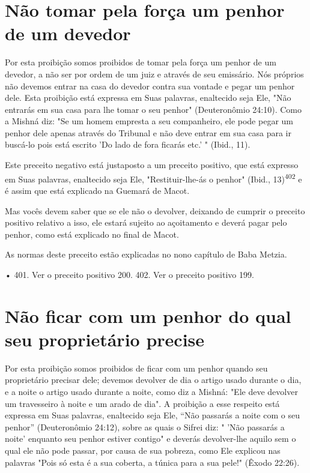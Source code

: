 \section{Não tomar pela força um penhor de um devedor}

Por esta proibição somos proibidos de tomar pela força um penhor de um
devedor, a não ser por ordem de um juiz e através de seu emissário. Nós
próprios não devemos entrar na casa do devedor contra sua vontade e
pe­gar um penhor dele. Esta proibição está expressa em Suas palavras,
enaltecido seja Ele, "Não entrarás em sua casa para lhe tomar o seu
penhor" (Deuteronô­mio 24:10). Como a Mishná diz: "Se um homem empresta
a seu companheiro, ele pode pegar um penhor dele apenas através do
Tribunal e não deve entrar em sua casa para ir buscá-lo pois está
escrito 'Do lado de fora ficarás etc.' " (Ibid., 11).

Este preceito negativo está justaposto a um preceito positivo, que está
expresso em Suas palavras, enaltecido seja Ele, "Restituir-lhe-ás o
penhor" (Ibid., 13)\textsuperscript{402} e é assim que está explicado na
Guemará de Macot.

Mas vocês devem saber que se ele não o devolver, deixando de cum­prir o
preceito positivo relativo a isso, ele estará sujeito ao açoitamento e
deve­rá pagar pelo penhor, como está explicado no final de Macot.


As normas deste preceito estão explicadas no nono capítulo de Baba
Metzia.

• 401. Ver o preceito positivo 200. 402. Ver o preceito positivo 199.



\section{Não ficar com um penhor do qual seu proprietário precise}

Por esta proibição somos proibidos de ficar com um penhor quan­do seu
proprietário precisar dele; devemos devolver de dia o artigo usado
du­rante o dia, e a noite o artigo usado durante a noite, como diz a
Mishná: "Ele deve devolver um travesseiro à noite e um arado de dia". A
proibição a esse respeito está expressa em Suas palavras, enaltecido
seja Ele, ``Não passarás a noite com o seu penhor'' (Deuteronômio 24:12),
sobre as quais o Sifrei diz: " 'Não passarás a noite' enquanto seu
penhor estiver contigo" e deverás devolver-lhe aquilo sem o qual ele não
pode passar, por causa de sua pobreza, como Ele explicou nas palavras
"Pois só esta é a sua coberta, a túnica para a sua pele!" (Êxodo 22:26).

